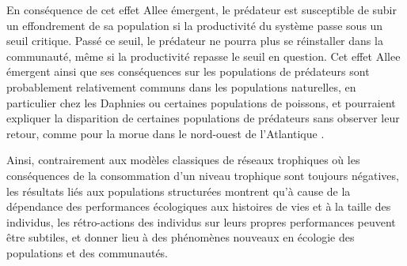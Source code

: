 En conséquence de cet effet Allee émergent, le prédateur est susceptible de
subir un effondrement de sa population si la productivité du système passe sous
un seuil critique. Passé ce seuil, le prédateur ne pourra plus se réinstaller
dans la communauté, même si la productivité repasse le seuil en question. 
Cet effet Allee émergent ainsi que ses conséquences sur les populations de
prédateurs sont probablement relativement communs dans les populations
naturelles, en particulier chez les Daphnies \autocites{mccauley1987a} ou certaines
populations de poissons, et pourraient expliquer la disparition de certaines
populations de prédateurs sans observer leur retour, comme pour la morue dans le
nord-ouest de l'Atlantique \autocites{carscadden2001a}.

Ainsi, contrairement aux modèles classiques de réseaux  trophiques où les
conséquences de la consommation d'un niveau trophique sont toujours négatives,
les résultats liés aux populations structurées montrent qu'à cause de la
dépendance des performances écologiques aux histoires de vies et à la taille des
individus, les rétro-actions des individus sur leurs propres performances
peuvent être subtiles, et donner lieu à des phénomènes nouveaux en écologie des
populations et des communautés. 

